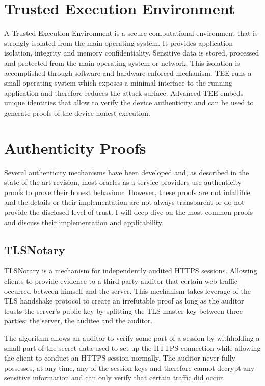 \section{Trusted Execution Environment}
A Trusted Execution Environment is a secure computational environment that is strongly isolated from the main operating system. It provides application isolation, integrity and memory confidentiality. Sensitive data is stored, processed and protected from the main operating system or network. This isolation is accomplished through software and hardware-enforced mechanism. TEE runs a small operating system which exposes a minimal interface to the running application and therefore reduces the attack surface. Advanced TEE embeds unique identities that allow to verify the device authenticity and can be used to generate proofs of the device honest execution.

\section{Authenticity Proofs}

Several authenticity mechanisms have been developed and, as described in the state-of-the-art revision, most oracles as a service providers use authenticity proofs to prove their honest behaviour. However, these proofs are not infallible and the details or their implementation are not always transparent or do not provide the disclosed level of trust. I will deep dive on the most common proofs and discuss their implementation and applicability.

\subsection{TLSNotary}

TLSNotary is a mechanism for independently audited HTTPS sessions. Allowing clients to provide evidence to a third party auditor that certain web traffic occurred between himself and the server. This mechanism takes leverage of the TLS handshake protocol to create an irrefutable proof as long as the auditor trusts the server's public key by splitting the TLS master key between three parties: the server, the auditee and the auditor.

The algorithm allows an auditor to verify some part of a session by withholding a small part of the secret data used to set up the HTTPS connection while allowing the client to conduct an HTTPS session normally. The auditor never fully possesses, at any time, any of the session keys and therefore cannot decrypt any sensitive information and can only verify that certain traffic did occur.

